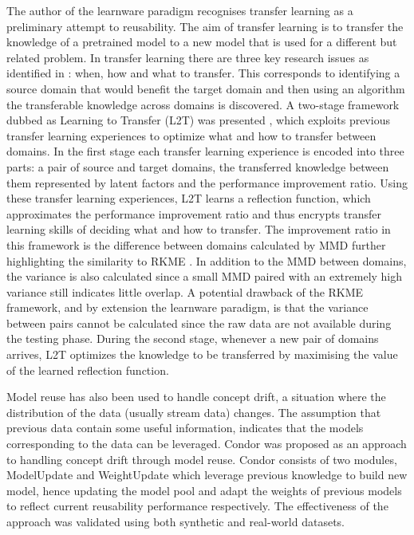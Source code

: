 \documentclass{mpaper}
\begin{document}
The author of the learnware paradigm \cite{Learnware} recognises transfer learning as a preliminary attempt to reusability. The aim of transfer learning is to transfer the knowledge of a pretrained model to a new model that is used for a different but related problem. In transfer learning there are three key research issues as identified in \cite{DefinitionTL}: when, how and what to transfer. This corresponds to identifying a source domain that would benefit the target domain and then using an algorithm the transferable knowledge across domains is discovered. A two-stage framework dubbed as Learning to Transfer (L2T) was presented \cite{L2T}, which exploits previous transfer learning experiences to optimize what and how to transfer between domains. In the first stage each transfer learning experience is encoded into three parts: a pair of source and target domains, the transferred knowledge between them represented by latent factors and the performance improvement ratio. Using these transfer learning experiences, L2T learns a reflection function, which approximates the performance improvement ratio and thus encrypts transfer learning skills of deciding what and how to transfer. The improvement ratio in this framework is the difference between domains calculated by MMD further highlighting the similarity to RKME \cite{KernelMMD}. In addition to the MMD between domains, the variance is also calculated since a small MMD paired with an extremely high variance still indicates little overlap. A potential drawback of the RKME \cite{KernelMMD} framework, and by extension the learnware paradigm, is that the variance between pairs cannot be calculated since the raw data are not available during the testing phase. During the second stage, whenever a new pair of domains arrives, L2T optimizes the knowledge to be transferred by maximising the value of the learned reflection function.

Model reuse has also been used to handle concept drift, a situation where the distribution of the data (usually stream data) changes. The assumption that previous data contain some useful information, indicates that the models corresponding to the data can be leveraged. Condor was proposed \cite{ConceptDrift} as an approach to handling concept drift through model reuse. Condor consists of two modules, ModelUpdate and WeightUpdate which leverage previous knowledge to build new model, hence updating the model pool and adapt the weights of previous models to reflect current reusability performance respectively. The effectiveness of the approach was validated using both synthetic and real-world datasets. 
\end{document}
